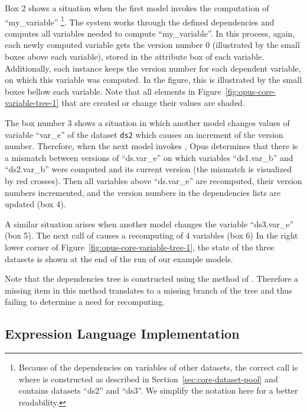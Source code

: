 Box 2 shows a situation when the first model invokes the computation of
``my_variable'' \footnote{Because of the dependencies on variables of other
  datasets, the correct call is\\
   where 
  is constructed as described in Section~\ref{sec:core-dataset-pool} and contains datasets ``ds2'' and ``ds3''.
  We simplify the notation here for
  a better readability.}. The system works through the defined dependencies and
computes all variables needed to compute ``my_variable''. In this process,
again, each newly computed variable gets the version number 0 (illustrated by
the small boxes above each variable), stored in the attribute box of each
variable. Additionally, each  instance keeps the version
number for each dependent variable, on which this variable was computed. In
the figure, this is illustrated by the small boxes bellow each variable.
Note that all elements in Figure~\ref{fig:opus-core-variable-tree-1} that are
created or change their values are shaded.

The box number 3 shows a situation in which another model changes values of
variable ``var_e'' of the dataset \verb|ds2| which causes an increment of the
version number. Therefore, when the next model invokes
, Opus determines that there is a
mismatch between versions of ``ds.var_e'' on which variables ``ds1.var_b'' and
``ds2.var_b'' were computed and its current version (the mismatch is visualized by red crosses). Then all
variables above ``ds.var_e'' are recomputed, their version numbers
incremented, and the version numbers in the dependencies lists are updated
(box 4).

A similar situation arises when another model changes the variable
``ds3.var_e'' (box 5). The next call of
 causes a recomputing of 4
variables (box 6) In the right lower corner of
Figure~\ref{fig:opus-core-variable-tree-1}, the state of the three datasets is
shown at the end of the run of our example models.

Note that the dependencies tree is constructed using the
 method of . Therefore a missing item
in this method translates to a missing branch of the tree and thus failing to
determine a need for recomputing.


\subsection{Expression Language Implementation}
\label{sec:implementation-of-expressions}

